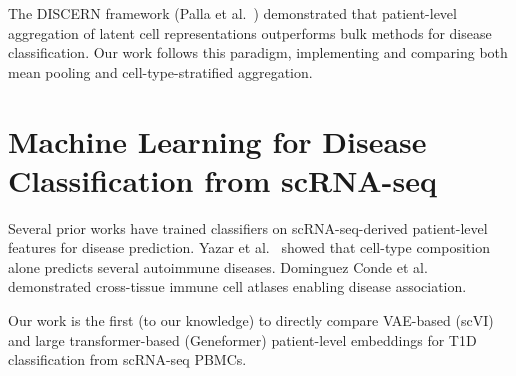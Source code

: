 The DISCERN framework (Palla et al.~\cite{palla2022squidpy}) demonstrated that patient-level aggregation of latent cell representations outperforms bulk methods for disease classification. Our work follows this paradigm, implementing and comparing both mean pooling and cell-type-stratified aggregation.

\section{Machine Learning for Disease Classification from scRNA-seq}

Several prior works have trained classifiers on scRNA-seq-derived patient-level features for disease prediction. Yazar et al.~\cite{yazar2022single} showed that cell-type composition alone predicts several autoimmune diseases. Dominguez Conde et al.~\cite{dominguez2022cross} demonstrated cross-tissue immune cell atlases enabling disease association.

Our work is the first (to our knowledge) to directly compare VAE-based (scVI) and large transformer-based (Geneformer) patient-level embeddings for T1D classification from scRNA-seq PBMCs.
